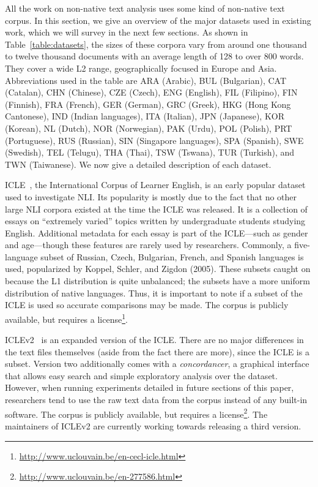 All the work on non-native text analysis uses some kind of non-native text
corpus. In this section, we give an overview of the major datasets used in
existing work, which we will survey in the next few sections. As shown in
Table~\ref{table:datasets}, the sizes of these corpora vary from around one
thousand to twelve thousand documents with an average length of 128 to over 800
words. They cover a wide L2 range, geographically focused in Europe and Asia.
Abbreviations used in the table are ARA (Arabic), BUL (Bulgarian), CAT
(Catalan), CHN (Chinese), CZE (Czech), ENG (English), FIL (Filipino), FIN
(Finnish), FRA (French), GER (German), GRC (Greek), HKG (Hong Kong Cantonese),
IND (Indian languages), ITA (Italian), JPN (Japanese), KOR (Korean), NL (Dutch),
NOR (Norwegian), PAK (Urdu), POL (Polish), PRT (Portuguese), RUS (Russian), SIN
(Singapore languages), SPA (Spanish), SWE (Swedish), TEL (Telugu), THA (Thai),
TSW (Tswana), TUR (Turkish), and TWN (Taiwanese). We now give a detailed
description of each dataset.

ICLE~\cite{icle}, the International Corpus of Learner English, is an early
popular dataset used to investigate NLI\@. Its popularity is mostly due to the
fact that no other large NLI corpora existed at the time the ICLE was released.
It is a collection of essays on ``extremely varied'' topics written by
undergraduate students studying English. Additional metadata for each essay is
part of the ICLE---such as gender and age---though these features are rarely
used by researchers. Commonly, a five-language subset of Russian, Czech,
Bulgarian, French, and Spanish languages is used, popularized
by Koppel, Schler, and Zigdon (2005). These subsets caught on because the L1 distribution is
quite unbalanced; the subsets have a more uniform distribution of native
languages. Thus, it is important to note if a subset of the ICLE is used so
accurate comparisons may be made. The corpus is publicly available, but requires
a license\footnote{\url{http://www.uclouvain.be/en-cecl-icle.html}}.

ICLEv2~\cite{iclev2} is an expanded version of the ICLE\@. There are no
major differences in the text files themselves (aside from the fact there are
more), since the ICLE is a subset. Version two additionally comes with a
\emph{concordancer}, a graphical interface that allows easy search and simple
exploratory analysis over the dataset. However, when running experiments
detailed in future sections of this paper, researchers tend to use the raw text
data from the corpus instead of any built-in software. The corpus is publicly
available, but requires a
license\footnote{\url{http://www.uclouvain.be/en-277586.html}}. The maintainers
of ICLEv2 are currently working towards releasing a third version.

